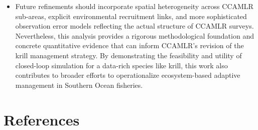 \documentclass[
]{article}
\begin{document}
\begin{itemize}
\item
  Future refinements should incorporate spatial heterogeneity across CCAMLR sub-areas, explicit environmental recruitment links, and more sophisticated observation error models reflecting the actual structure of CCAMLR surveys. Nevertheless, this analysis provides a rigorous methodological foundation and concrete quantitative evidence that can inform CCAMLR's revision of the krill management strategy. By demonstrating the feasibility and utility of closed-loop simulation for a data-rich species like krill, this work also contributes to broader efforts to operationalize ecosystem-based adaptive management in Southern Ocean fisheries.
\end{itemize}

\pagebreak

\hypertarget{references}{%
\section{References}\label{references}}
\end{document}
